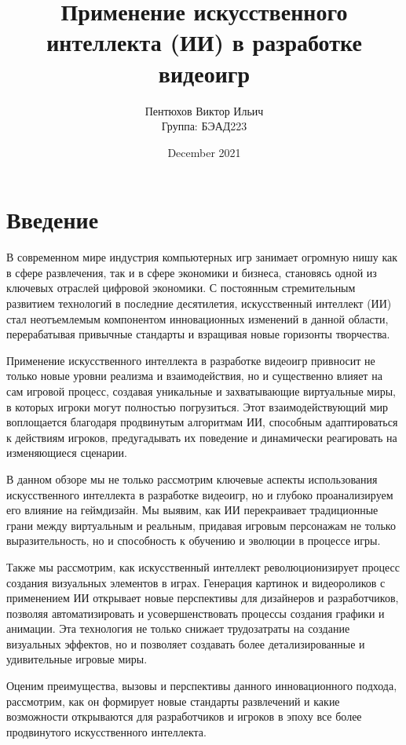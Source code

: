 \documentclass[14pt]{article}
\title{ \vspace{230px} \textbf{Применение искусственного интеллекта (ИИ) в разработке видеоигр}}
\author{Пентюхов Виктор Ильич\\
\AND
Группа: БЭАД223\\
\AND
\AND
\AND
\AND
\AND
}
\date{December 2021}
\begin{document}
\maketitle


\newpage
\tableofcontents
\thispagestyle{empty}



\newpage
\setcounter{page}{1}
\section{Введение}
В современном мире индустрия компьютерных игр занимает огромную нишу как в сфере развлечения, так и в сфере экономики и бизнеса, становясь одной из ключевых отраслей цифровой экономики. С постоянным стремительным развитием технологий в последние десятилетия, искусственный интеллект (ИИ) стал неотъемлемым компонентом инновационных изменений в данной области, перерабатывая привычные стандарты и взращивая новые горизонты творчества.

Применение искусственного интеллекта в разработке видеоигр привносит не только новые уровни реализма и взаимодействия, но и существенно влияет на сам игровой процесс, создавая уникальные и захватывающие виртуальные миры, в которых игроки могут полностью погрузиться. Этот взаимодействующий мир воплощается благодаря продвинутым алгоритмам ИИ, способным адаптироваться к действиям игроков, предугадывать их поведение и динамически реагировать на изменяющиеся сценарии.

В данном обзоре мы не только рассмотрим ключевые аспекты использования искусственного интеллекта в разработке видеоигр, но и глубоко проанализируем его влияние на геймдизайн. Мы выявим, как ИИ перекраивает традиционные грани между виртуальным и реальным, придавая игровым персонажам не только выразительность, но и способность к обучению и эволюции в процессе игры.

Также мы рассмотрим, как искусственный интеллект революционизирует процесс создания визуальных элементов в играх. Генерация картинок и видеороликов с применением ИИ открывает новые перспективы для дизайнеров и разработчиков, позволяя автоматизировать и усовершенствовать процессы создания графики и анимации. Эта технология не только снижает трудозатраты на создание визуальных эффектов, но и позволяет создавать более детализированные и удивительные игровые миры.

Оценим преимущества, вызовы и перспективы данного инновационного подхода, рассмотрим, как он формирует новые стандарты развлечений и какие возможности открываются для разработчиков и игроков в эпоху все более продвинутого искусственного интеллекта.
\end{document}
